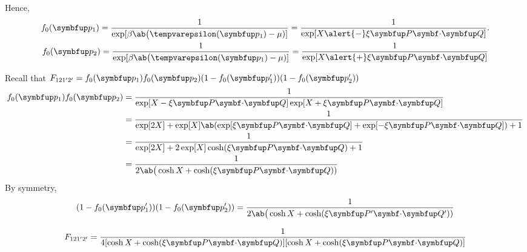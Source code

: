 \begin{frame}
  Hence,
  \begin{gather}
    f_0(\vv{p}_1) = \frac{1}{\exp[\beta\ab\big(\epsilon(\vv{p}_1) - \mu)]} = \frac{1}{\exp[X \alert{-} \xi \vv{P} \vdot \vv{Q}]}. \\
    f_0(\vv{p}_2) = \frac{1}{\exp[\beta\ab\big(\epsilon(\vv{p}_1) - \mu)]} = \frac{1}{\exp[X \alert{+} \xi \vv{P} \vdot \vv{Q}]}
  \end{gather}
\end{frame}

\begin{frame}
  Recall that \(F_{121'2'} = f_0(\vv{p}_1)f_0(\vv{p}_2)(1 - f_0(\vv{p}_1'))(1 - f_0(\vv{p}_2'))\)
  \begin{align}
    f_0(\vv{p}_1)f_0(\vv{p}_2)
     & = \frac{1}{\exp[X - \xi \vv{P} \vdot \vv{Q}]\exp[X + \xi \vv{P} \vdot \vv{Q}]}                        \\
     & = \frac{1}{\exp[2X] + \exp[X]\ab(\exp[\xi \vv{P} \vdot \vv{Q}] + \exp[-\xi \vv{P} \vdot \vv{Q}]) + 1} \\
     & = \frac{1}{\exp[2X] + 2\exp[X]\cosh(\xi \vv{P} \vdot \vv{Q}) + 1}                                     \\
     & = \frac{1}{2\ab\big(\cosh X + \cosh(\xi \vv{P} \vdot \vv{Q}))}
  \end{align}
  By symmetry,
  \begin{align}
    (1 - f_0(\vv{p}_1'))(1 - f_0(\vv{p}_2')) = \frac{1}{2\ab\big(\cosh X + \cosh(\xi \vv{P'} \vdot \vv{Q'}))}
  \end{align}

  \begin{blk}{}
    \begin{equation}
      F_{121'2'} = \frac{1}{4[\cosh X + \cosh(\xi \vv{P} \vdot \vv{Q})][\cosh X + \cosh(\xi \vv{P} \vdot \vv{Q})]}
    \end{equation}
  \end{blk}
\end{frame}

